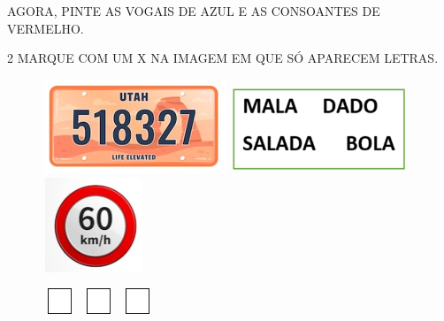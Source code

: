 \begin{escolha}
\item AGORA, PINTE AS VOGAIS DE AZUL E AS CONSOANTES DE VERMELHO.
\end{escolha}


\num{2} MARQUE COM UM X NA IMAGEM EM QUE SÓ APARECEM LETRAS.

\begin{figure}[htpb!]
\includegraphics[width=2.18819in,height=1.11111in]{media/image2.png}
\includegraphics[width=2.03681in,height=1.04861in]{media/image3.png}
\includegraphics[width=1.20556in,height=1.11111in]{media/image4.png}

\hspace{2cm}\includegraphics[width=0.40972in,height=0.30069in]{media/image5.png}
\hspace{4.5cm}\includegraphics[width=0.40972in,height=0.30069in]{media/image5.png}
\hspace{3cm}\includegraphics[width=0.40972in,height=0.30069in]{media/image5.png}
\end{figure}

